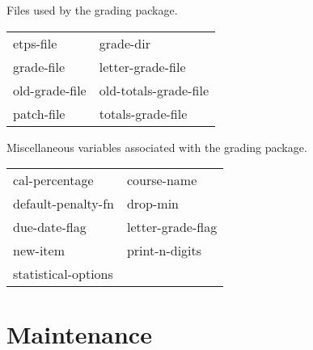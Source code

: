 \begin{description} 
\item[GR-FILENAMES]  
Files used by the grading package.

\begin{tabular}{l l}
etps-file&grade-dir\\
grade-file&letter-grade-file\\
old-grade-file&old-totals-grade-file\\
patch-file&totals-grade-file\\
\end{tabular}

\item[GR-MISC]  
Miscellaneous variables associated with the grading package.

\begin{tabular}{l l}
cal-percentage&course-name\\
default-penalty-fn&drop-min\\
due-date-flag&letter-grade-flag\\
new-item&print-n-digits\\
statistical-options
\end{tabular}
\item
\end{description}

\section{Maintenance}

